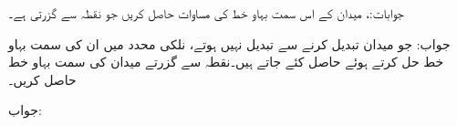 جوابات:، 
میدان  کے اس سمت بہاو خط کی مساوات حاصل کریں جو نقطہ  سے گزرتی ہے۔

جواب:
جو میدان  تبدیل کرنے سے تبدیل نہیں ہوتے، نلکی محدد میں ان کی سمت بہاو خط  حل کرتے ہوئے حاصل کئے جاتے ہیں۔نقطہ  سے گزرتے  میدان  کی سمت بہاو خط حاصل کریں۔

جواب:
